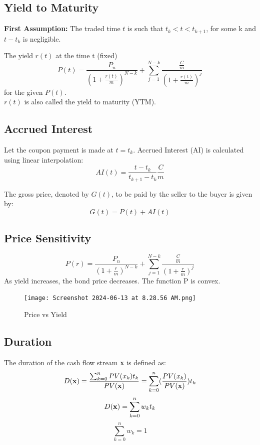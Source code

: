 \documentclass{report}
\begin{document}
\subsection{Yield to Maturity}
\textbf{First Assumption:} The traded time $t$ is such that $t_k < t < t_{k+1}$, for some k and $t-t_k$ is negligible.

The yield $r(t)$ at the time t (fixed)
\begin{equation}
    P(t) = \frac{P_n}{(1+\frac{r(t)}{m})^{N-k}} + \sum_{j=1}^{N-k}\frac{\frac{C}{m}}{(1+\frac{r(t)}{m})^{j}}
\end{equation}
for the given $P(t)$.\\
$r(t)$ is also called the yield to maturity (YTM).

\subsection{Accrued Interest}
Let the coupon payment is made at $t=t_k$.
Accrued Interest (AI) is calculated using linear interpolation:
\begin{equation}
    AI(t) = \frac{t-t_k}{t_{k+1}-t_k}\frac{C}{m}
\end{equation}

The gross price, denoted by $G(t)$, to be paid by the seller to the buyer is given by:
\begin{equation}
    G(t) = P(t) + AI(t)
\end{equation}

\subsection{Price Sensitivity}
\begin{equation}
    P(r) = \frac{P_n}{(1+\frac{r}{m})^{N-k}} + \sum_{j=1}^{N-k}\frac{\frac{C}{m}}{(1+\frac{r}{m})^{j}}
\end{equation}
As yield increases, the bond price decreases. The function P is convex.

\begin{figure}[h!]
     \centering
     \texttt{[image: Screenshot 2024-06-13 at 8.28.56 AM.png]}
     \caption{Price vs Yield}
     \label{fig:pvy}
\end{figure}

\subsection{Duration}
The duration of the cash flow stream {\bf x} is defined as:
\begin{equation}
    D({\bf x}) = \frac{\sum_{k=0}^nPV(x_k)t_k}{PV({\bf x})} = \sum_{k=0}^n(\frac{PV(x_k)}{PV({\bf x})})t_k
\end{equation}
\[
D({\bf x}) = \sum_{k=0}^nw_kt_k
\]
\[
\sum_{k=0}^nw_k = 1
\]
\end{document}
